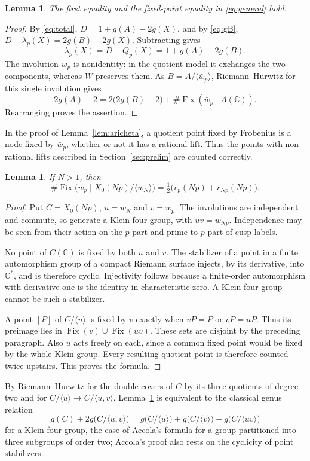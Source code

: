 \documentclass[11pt,a4paper]{article}
\newtheorem{lemma}[theorem]{Lemma}
\theoremstyle{remark}\newtheorem{remark}[theorem]{Remark}
\numberwithin{equation}{section}
\newcommand{\C}{\mathbb C}\newcommand{\Fp}{\mathbb F_p}
\newcommand{\Fix}{\operatorname{Fix}}
\begin{document}
	\begin{lemma}\label{lem:single}
		The first equality and the fixed-point equality in \eqref{eq:general} hold.
	\end{lemma}
	\begin{proof}
		By \eqref{eq:total}, $D=1+g(A)-2g(X)$, and by \eqref{eq:gB}, $D-\lambda_p(X)=2g(B)-2g(X)$. Subtracting gives
		\[
		\lambda_p(X)=D-Q_p(X)=1+g(A)-2g(B).
		\]
		The involution $\bar w_p$ is nonidentity: in the quotient model it exchanges the two components, whereas $W$ preserves them. As $B=A/\langle\bar w_p\rangle$, Riemann--Hurwitz for this single involution gives
		\[
		2g(A)-2=2\bigl(2g(B)-2\bigr)
		+\#\Fix(\bar w_p\mid A(\C)).
		\]
		Rearranging proves the assertion.
	\end{proof}
	
	In the proof of Lemma~\ref{lem:aricheta}, a quotient point fixed by Frobenius is a node fixed by $\bar w_p$, whether or not it has a rational lift. Thus the points with non-rational lifts described in Section~\ref{sec:prelim} are counted correctly.
	
	\begin{lemma}\label{lem:lift}
		If $N>1$, then
		\[
		\#\Fix\bigl(\bar w_p\mid X_0(Np)/\langle w_N\rangle\bigr)
		=\tfrac12\bigl(r_p(Np)+r_{Np}(Np)\bigr).
		\]
	\end{lemma}
	\begin{proof}
		Put $C=X_0(Np)$, $u=w_N$ and $v=w_p$. The involutions are independent and commute, so generate a Klein four-group, with $uv=w_{Np}$. Independence may be seen from their action on the $p$-part and prime-to-$p$ part of cusp labels.
		
		No point of $C(\C)$ is fixed by both $u$ and $v$. The stabilizer of a point in a finite automorphism group of a compact Riemann surface injects, by its derivative, into $\C^*$, and is therefore cyclic. Injectivity follows because a finite-order automorphism with derivative one is the identity in characteristic zero. A Klein four-group cannot be such a stabilizer.
		
		A point $[P]$ of $C/\langle u\rangle$ is fixed by $\bar v$ exactly when $vP=P$ or $vP=uP$. Thus its preimage lies in $\Fix(v)\cup\Fix(uv)$. These sets are disjoint by the preceding paragraph. Also $u$ acts freely on each, since a common fixed point would be fixed by the whole Klein group. Every resulting quotient point is therefore counted twice upstairs. This proves the formula.
	\end{proof}
	
	By Riemann--Hurwitz for the double covers of $C$ by its three quotients of degree two and for $C/\langle u\rangle\to C/\langle u,v\rangle$, Lemma~\ref{lem:lift} is equivalent to the classical genus relation
	\[
	g(C)+2g\bigl(C/\langle u,v\rangle\bigr)=g\bigl(C/\langle u\rangle\bigr)+g\bigl(C/\langle v\rangle\bigr)+g\bigl(C/\langle uv\rangle\bigr)
	\]
	for a Klein four-group, the case of Accola's formula \cite[Theorem 1, Corollary, eq.~(11), p.~600]{Accola} for a group partitioned into three subgroups of order two; Accola's proof also rests on the cyclicity of point stabilizers.
	
\end{document}
